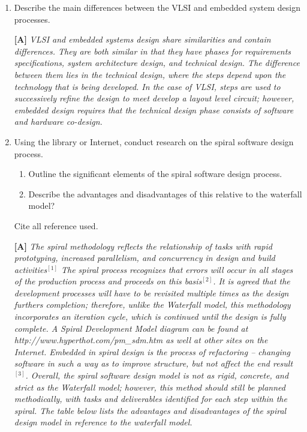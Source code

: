 \begin{enumerate}
  
\item
  Describe the main differences between the VLSI and embedded system
  design processes.
  
\begin{onlysolution}
\textbf{[A]}
\itshape
  VLSI and embedded systems design share similarities and contain
differences. They are both similar in that they have phases for
requirements specifications, system architecture design, and technical
design. The difference between them lies in the technical design, where
the steps depend upon the technology that is being developed. In the
case of VLSI, steps are used to successively refine the design to meet
develop a layout level circuit; however, embedded design requires that
the technical design phase consists of software and hardware co-design.
\end{onlysolution}

\item
Using the library or Internet, conduct research on the spiral software design process.  
\begin{enumerate}
\item Outline the significant elements of the spiral software design process.  
\item Describe the advantages and disadvantages of this relative to the waterfall model? 
\end{enumerate}
Cite all reference used.
  
\begin{onlysolution}
\textbf{[A]}
\itshape
The spiral methodology reflects the relationship of tasks with rapid
prototyping, increased parallelism, and concurrency in design and build
activities$^{[1]}$ The spiral process recognizes that errors will occur in all
stages of the production process and proceeds on this basis$^{[2]}$. It is
agreed that the development processes will have to be revisited multiple
times as the design furthers completion; therefore, unlike the Waterfall
model, this methodology incorporates an iteration cycle, which is
continued until the design is fully complete. A Spiral Development Model
diagram can be found at http://www.hyperthot.com/pm\_sdm.htm as
well at other sites on the Internet.
Embedded in spiral design is the process of refactoring -- changing
software in such a way as to improve structure, but not affect the end
result$^{[3]}$. Overall, the spiral software design model is not as rigid,
concrete, and strict as the Waterfall model; however, this method should
still be planned methodically, with tasks and deliverables identified
for each step within the spiral. The table below lists the advantages
and disadvantages of the spiral design model in reference to the
waterfall model.


\end{onlysolution}
\end{enumerate}
